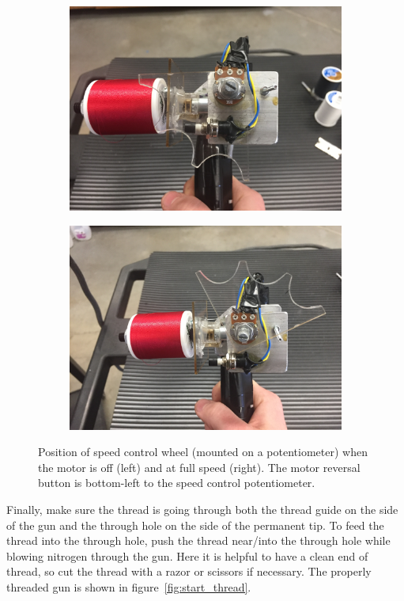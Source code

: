 \documentclass[letterpaper,12pt]{article}
\begin{document}
\begin{figure}[h!]
\centering
\begin{subfigure}{.5\textwidth}
  \centering
  \includegraphics[width=0.9\linewidth]{controls_off.jpg}
\end{subfigure}%
\begin{subfigure}{.5\textwidth}
  \centering
  \includegraphics[width=0.9\linewidth]{controls_on.jpg}
\end{subfigure}
\caption{Position of speed control wheel (mounted on a potentiometer) when the motor is off (left) and at full speed (right). The motor reversal button is bottom-left to the speed control potentiometer.}
\label{fig:speed}
\end{figure}
Finally, make sure the thread is going through both the thread guide on the side of the gun and the through hole on the side of the permanent tip. To feed the thread into the through hole, push the thread near/into the through hole while blowing nitrogen through the gun. Here it is helpful to have a clean end of thread, so cut the thread with a razor or scissors if necessary. The properly threaded gun is shown in figure~\ref{fig:start_thread}. \par
\end{document}
